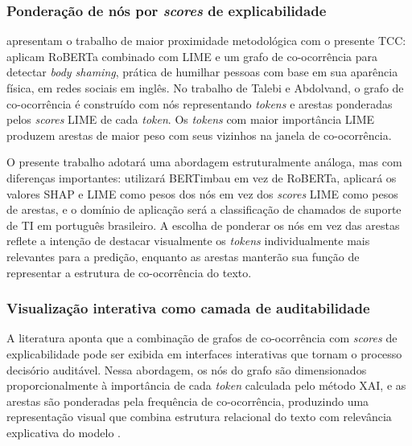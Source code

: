 \documentclass[
    12pt,                %
    openright,           %
    oneside,             %
    a4paper,             %
    english,             %
    brazil               %
]{abntex2}
\begin{document}
\subsubsection{Ponderação de nós por \textit{scores} de explicabilidade}
\label{subsubsec:grafo_xai_ponderacao}

 apresentam o trabalho de maior proximidade 
metodológica com o presente TCC: aplicam RoBERTa combinado com LIME 
e um grafo de co-ocorrência para detectar \textit{body shaming}, 
prática de humilhar pessoas com base em sua aparência física, em 
redes sociais em inglês. No trabalho de Talebi e Abdolvand, o grafo 
de co-ocorrência é construído com nós representando \textit{tokens} 
e arestas ponderadas pelos \textit{scores} LIME de cada \textit{token}. 
Os \textit{tokens} com maior importância LIME produzem arestas de 
maior peso com seus vizinhos na janela de co-ocorrência.

O presente trabalho adotará uma abordagem estruturalmente análoga, 
mas com diferenças importantes: utilizará BERTimbau em vez de 
RoBERTa, aplicará os valores SHAP e LIME como pesos dos nós em vez dos 
\textit{scores} LIME como pesos de arestas, e o domínio de aplicação 
será a classificação de chamados de suporte de TI em português 
brasileiro. A escolha de ponderar os nós em vez das arestas reflete 
a intenção de destacar visualmente os \textit{tokens} individualmente 
mais relevantes para a predição, enquanto as arestas manterão sua 
função de representar a estrutura de co-ocorrência do texto.

\subsubsection{Visualização interativa como camada de auditabilidade}
\label{subsubsec:grafo_xai_visualizacao}

A literatura aponta que a combinação de grafos de co-ocorrência com \textit{scores} de explicabilidade pode ser exibida em interfaces interativas 
que tornam o processo decisório auditável. Nessa abordagem, os nós 
do grafo são dimensionados proporcionalmente à importância de cada 
\textit{token} calculada pelo método XAI, e as arestas são ponderadas 
pela frequência de co-ocorrência, produzindo uma representação visual 
que combina estrutura relacional do texto com relevância explicativa 
do modelo \cite{talebi2025}.
\end{document}
